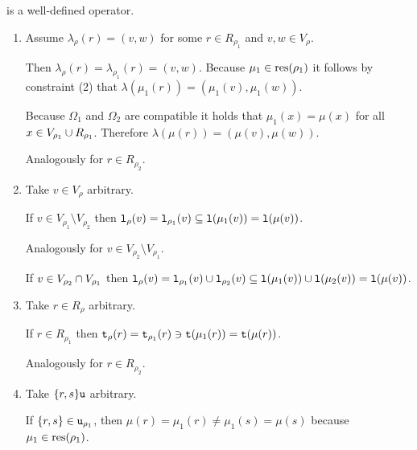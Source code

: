 \begin{definition}
\begin{proofof}{ is a well-defined operator.}
\begin{itemize}
\begin{enumerate}[(1)]
        Take $r \in R_\rho$ arbitrary. If $r \in R_{\rho_1}$ then $\mu(r) = \mu_1(r)$ and
        because $\mu_1 \in \Omega_1$ and $\Omega_1$ is a query result it holds that $\mu_1(r) \in R$.
        Analogously for $r \in R_{\rho_2}$.
        
      \item %
        Assume $\lambda_\rho(r) = (v, w)$ for some $r \in R_{\rho_1}$ and $v,w \in V_\rho$.
        
        Then $\lambda_\rho(r) = \lambda_{\rho_1}(r) = (v, w)$. Because $\mu_1 \in \text{res}(\rho_1)$
        it follows by constraint (2) that $\lambda(\mu_1(r)) = (\mu_1(v), \mu_1(w))$.
        
        Because $\Omega_1$ and $\Omega_2$ are compatible it holds that $\mu_1(x) = \mu(x)$ for all
        $x \in V_{\rho_1} \cup R_{\rho_1}$. Therefore $\lambda(\mu(r)) = (\mu(v), \mu(w))$.
        
        Analogously for $r \in R_{\rho_2}$.
      
      \item %
        Take $v \in V_\rho$ arbitrary.
        
        If $v \in V_{\rho_1} \setminus V_{\rho_2}$
        then $\texttt{l}_\rho(v) = \texttt{l}_{\rho_1}(v) \subseteq \texttt{l}(\mu_1(v)) = \texttt{l}(\mu(v))$.
        
        Analogously for $v \in V_{\rho_2} \setminus V_{\rho_1}$.
        
        If $v \in V_{\rho_2} \cap V_{\rho_1}$
        then $\texttt{l}_\rho(v) = \texttt{l}_{\rho_1}(v) \cup \texttt{l}_{\rho_2}(v)
          \subseteq \texttt{l}(\mu_1(v)) \cup \texttt{l}(\mu_2(v)) = \texttt{l}(\mu(v))$.
      
      \item %
        Take $r \in R_\rho$ arbitrary.
        
        If $r \in R_{\rho_1}$ then $\texttt{t}_\rho(r) = \texttt{t}_{\rho_1}(r) \ni \texttt{t}(\mu_1(r)) = \texttt{t}(\mu(r))$.
        
        Analogously for $r \in R_{\rho_2}$.
      
      \item %
        Take $\{r,s\} \texttt{u}$ arbitrary.
        
        If $\{r,s\} \in \texttt{u}_{\rho_1}$, then
        $\mu(r) = \mu_1(r) \not = \mu_1(s) = \mu(s)$ because
        $\mu_1 \in \text{res}(\rho_1)$.
        

\end{enumerate}
\end{itemize}
\end{proofof}
\end{definition}
